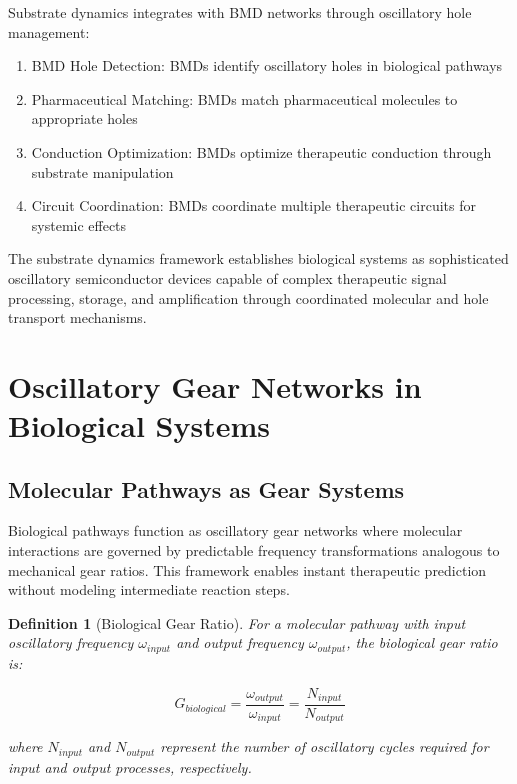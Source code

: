 \documentclass[12pt,a4paper]{article}
\newtheorem{definition}{Definition}[section]
\begin{document}
Substrate dynamics integrates with BMD networks through oscillatory hole management:

\begin{enumerate}
\item BMD Hole Detection: BMDs identify oscillatory holes in biological pathways
\item Pharmaceutical Matching: BMDs match pharmaceutical molecules to appropriate holes
\item Conduction Optimization: BMDs optimize therapeutic conduction through substrate manipulation
\item Circuit Coordination: BMDs coordinate multiple therapeutic circuits for systemic effects
\end{enumerate}

The substrate dynamics framework establishes biological systems as sophisticated oscillatory semiconductor devices capable of complex therapeutic signal processing, storage, and amplification through coordinated molecular and hole transport mechanisms.

\section{Oscillatory Gear Networks in Biological Systems}

\subsection{Molecular Pathways as Gear Systems}

Biological pathways function as oscillatory gear networks where molecular interactions are governed by predictable frequency transformations analogous to mechanical gear ratios. This framework enables instant therapeutic prediction without modeling intermediate reaction steps.

\begin{definition}[Biological Gear Ratio]
For a molecular pathway with input oscillatory frequency $\omega_{input}$ and output frequency $\omega_{output}$, the biological gear ratio is:

\begin{equation}
G_{biological} = \frac{\omega_{output}}{\omega_{input}} = \frac{N_{input}}{N_{output}}
\end{equation}

where $N_{input}$ and $N_{output}$ represent the number of oscillatory cycles required for input and output processes, respectively.
\end{definition}
\end{document}
